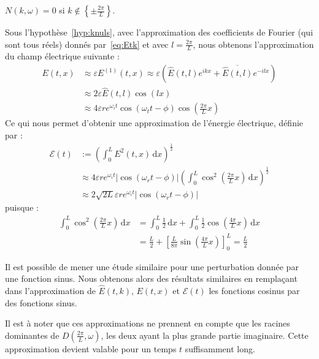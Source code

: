\begin{hyp}
  $N(k,\omega) = 0$ si $k\notin\left\{\pm\frac{2\pi}{L}\right\}$.
  \label{hyp:knuls}
\end{hyp}
Sous l'hypothèse~\ref{hyp:knuls}, avec l'approximation des coefficients de Fourier (qui sont tous réels) donnés par~\eqref{eq:Etk} et avec $l=\frac{2\pi}{L}$, nous obtenons l'approximation du champ électrique suivante :
$$
  \begin{aligned}
    E(t,x) &\approx \varepsilon E^{(1)}(t,x) \approx \varepsilon\left( \hat{E}(t,l)e^{ikx} + \overline{\hat{E}(t,l)}e^{-ilx} \right) \\
           &\approx 2\varepsilon \hat{E}(t,l)\cos(lx) \\
           &\approx 4\varepsilon r e^{\omega_i t}\cos(\omega_t t -\phi)\cos\left(\frac{2\pi}{L}x\right)
  \end{aligned}
$$
Ce qui nous permet d'obtenir une approximation de l'énergie électrique, définie par :
\begin{equation}
  \begin{aligned}
    \mathcal{E}(t) & := \left( \int_0^L E^2(t,x)\,\mathrm{d}x \right)^{\frac{1}{2}} \\
                   & \approx 4\varepsilon r e^{\omega_i t}\left|\cos(\omega_rt - \phi)\right|\left( \int_0^L \cos^2\left(\frac{2\pi}{L}x\right)\,\mathrm{d}x \right)^{\frac{1}{2}} \\
                   & \approx 2\sqrt{2L}\varepsilon r e^{\omega_i t}\left|\cos(\omega_rt - \phi)\right|
  \end{aligned}
\label{eq:enelec}\end{equation}
puisque :
$$
  \begin{aligned}
    \int_0^L \cos^2\left(\frac{2\pi}{L}x\right)\,\mathrm{d}x
      & = \int_0^L\frac{1}{2}\,\mathrm{d}x + \int_0^L\frac{1}{2}\cos\left(\frac{4\pi}{L}x\right)\,\mathrm{d}x \\
      & = \frac{L}{2} + \left[ \frac{L}{8\pi}\sin\left(\frac{4\pi}{L}x\right)\right]_0^L = \frac{L}{2}
  \end{aligned}
$$

\begin{remark}
  Il est possible de mener une étude similaire pour une perturbation donnée par une fonction sinus. Nous obtenons alors des résultats similaires en remplaçant dans l'approximation de $\hat{E}(t,k)$, $E(t,x)$ et $\mathcal{E}(t)$ les fonctions cosinus par des fonctions sinus.
\end{remark}

Il est à noter que ces approximations ne prennent en compte que les racines dominantes de $D(\frac{2\pi}{L},\omega)$, les deux ayant la plus grande partie imaginaire. Cette approximation devient valable pour un temps $t$ suffisamment long.

